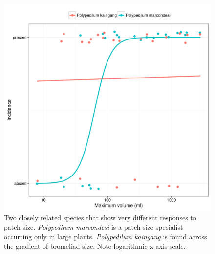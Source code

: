 \begin{figure}[htbp]
\centering
\includegraphics[width=5.5in]{figures/poly_curve.pdf}
\caption[\emph{Polypedilum marcondesi} is a patch size specialist occurring
only in large plants. \emph{Polypedilum kaingang} is found across the
gradient of bromeliad size.]{Two closely
related species that show very different responses to patch size.
\emph{Polypedilum marcondesi} is a patch size specialist occurring
only in large plants. \emph{Polypedilum kaingang} is found across the
gradient of bromeliad size. Note logarithmic x-axis scale.}
\label{fig:poly_curve}
\end{figure}


